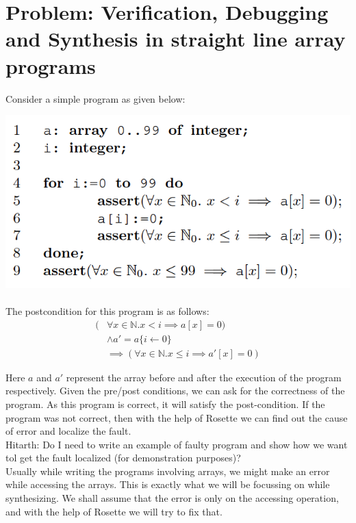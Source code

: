 \documentclass[a4paper, 12pt, notitlepage] {article}
\newcommand{\hcmt}[1]{{\color{magenta} \tiny{Hitarth: {#1}}}}
\begin{document}
\section {Problem: Verification, Debugging and Synthesis in straight line array programs}
Consider a simple program as given below:

\includegraphics[scale=0.6]{arrayprogex} \\
\\

The postcondition for this program is as follows:
\begin{equation}
\begin{split}
(&\forall{x \in \mathbb{N}} . x<i \implies a[x] = 0)  \\
	&\land a' = a\{i \leftarrow 0\} \\
	&\implies (\forall{x \in \mathbb{N}} . x \leq i \implies a'[x] = 0) 
\end{split}
\end{equation}

Here $a$ and $a'$ represent the array before and after the execution of the program respectively.
Given the pre/post conditions, we can ask for the correctness of the program. As this program is correct, it will satisfy the post-condition. If the program was not correct, then with the help of Rosette we can find out the cause of error and localize the fault. \\
\hcmt {Do I need to write an example of faulty program and show how we want tol get the fault localized (for demonstration purposes)?}
\\
Usually while writing the programs involving arrays, we might make an error while accessing the arrays. This is exactly what we will be focussing on while synthesizing. We shall assume that the error is only on the accessing operation, and with the help of Rosette we will try to fix that.\\\\
\end{document}
